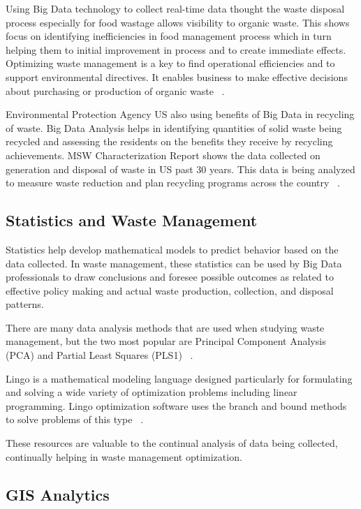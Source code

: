 \documentclass[sigconf]{acmart}
\begin{document}
Using Big Data technology to collect real-time data thought the waste disposal process especially for food wastage allows visibility to organic waste. This shows focus on identifying inefficiencies in food management process which in turn helping them to initial improvement in process and to create immediate effects. Optimizing waste management is a key to find operational efficiencies and to support environmental directives. It enables business to make effective decisions about purchasing or production of organic waste ~\cite{frank2016}.

Environmental Protection Agency US also using benefits of Big Data in recycling of waste. Big Data Analysis helps in identifying quantities of solid waste being recycled and assessing the residents on the benefits they receive by recycling achievements. MSW Characterization Report shows the data collected on generation and disposal of waste in US past 30 years. This data is being analyzed to measure waste reduction and plan recycling programs across the country ~\cite{epaRecycleBenefits2007}.


\subsection{Statistics and Waste Management}

Statistics help develop mathematical models to predict behavior based on the data collected.  In waste management, these statistics can be used by Big Data professionals to draw conclusions and foresee possible outcomes as related to effective policy making and actual waste production, collection, and disposal patterns. 

There are many data analysis methods that are used when studying waste management, but the two most popular are Principal Component Analysis (PCA) and Partial Least Squares (PLS1) ~\cite{bohm2013}.

Lingo is a mathematical modeling language designed particularly for formulating and solving a wide variety of optimization problems including linear programming. Lingo optimization software uses the branch and bound methods to solve problems of this type ~\cite{akbarpour2016}.  

These resources are valuable to the continual analysis of data being collected, continually helping in waste management optimization.

\subsection{GIS Analytics}
\end{document}
